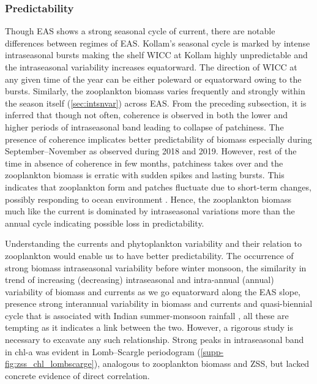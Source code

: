 \documentclass{article}
\begin{document}
 	\subsubsection{Predictability}
    Though EAS shows a strong seasonal cycle of current, there are notable differences between regimes of EAS. Kollam's seasonal cycle is marked by intense intraseasonal bursts making the shelf WICC at Kollam highly unpredictable \citep{chaudhuri2021observed} and the intraseasonal variability increases equatorward. The direction of WICC at any given time of the year can be either poleward or equatorward owing to the bursts. Similarly, the zooplankton biomass varies frequently and strongly within the season itself (\cref{sec:intsnvar}) across EAS. From the preceding subsection, it is inferred that though not often, coherence is observed in both the lower and higher periods of intraseasonal band leading to collapse of patchiness. The presence of coherence implicates better predictability of biomass especially during September--November as observed during 2018 and 2019. However, rest of the time in absence of coherence in few months, patchiness takes over and the zooplankton biomass is erratic with sudden spikes and lasting bursts. This indicates that zooplankton form and patches fluctuate due to short-term changes, possibly responding to ocean environment \citep{folt1999biological,raghukumar2003marine,anil2021short}. Hence, the zooplankton biomass much like the current is dominated by intraseasonal variations more than the annual cycle indicating possible loss in predictability. 
         
	Understanding the currents and phytoplankton variability and their relation to zooplankton would enable us to have better predictability. The occurrence of strong biomass intraseasonal variability before winter monsoon, the similarity in trend of increasing (decreasing) intraseasonal and intra-annual (annual) variability  of biomass and currents as we go equatorward along the EAS slope, presence strong interannual variability in biomass and currents and quasi-biennial cycle that is associated with Indian summer-monsoon rainfall \citep{mooley1984fluctuations,bhalme1987tropical,meehl2002tropospheric}, all these are tempting as it indicates a link between the two. However, a rigorous study is necessary to excavate any such relationship. Strong peaks in intraseasonal band in chl-a was evident in Lomb--Scargle periodogram (\cref{supp-fig:zss_chl_lombscarge}), analogous to zooplankton biomass and ZSS, but lacked concrete evidence of direct correlation. 
 	  
\end{document}
